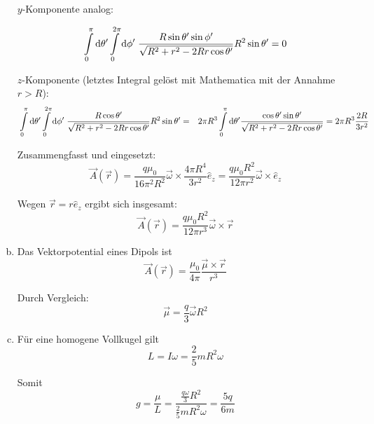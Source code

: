 \documentclass[a4paper,german,12pt,smallheadings]{scrartcl}
\begin{document}
\begin{enumerate}[a)]
  $y$-Komponente analog:

  \begin{align}
    \int\limits_0^\pi \dif \theta'
    \int\limits_0^{2 \pi} \dif \phi' \;
    \frac{R \sin \theta' \sin \phi'}{\sqrt{R^2 + r^2 - 2Rr \cos \theta'}} R^2 \sin \theta' = 0
  \end{align}

  $z$-Komponente (letztes Integral gelöst mit Mathematica mit der Annahme $r >
  R$):
  \begin{align}
    &\int\limits_0^\pi \dif \theta'
    \int\limits_0^{2 \pi} \dif \phi' \;
    \frac{R \cos \theta'}{\sqrt{R^2 + r^2 - 2Rr \cos \theta'}} R^2 \sin \theta'
    =
    &2 \pi R^3
    \int\limits_0^\pi \dif \theta'
    \frac{\cos \theta' \sin \theta'}{\sqrt{R^2 + r^2 - 2Rr \cos \theta'}}
    = 2 \pi R^3 \frac{2R}{3 r^2}
  \end{align}

  Zusammengfasst und eingesetzt:
  \begin{equation}
    \vec{A}(\vec{r})
    = \frac{q \mu_0}{16 \pi^2 R^2} \vec{\omega} \times \frac{4 \pi R^4}{3 r^2} \hat{e}_z
    = \frac{q \mu_0 R^2}{12 \pi r^2} \vec{\omega} \times \hat{e}_z
  \end{equation}

  Wegen $\vec{r} = r \hat{e}_z$ ergibt sich insgesamt:
  \begin{equation}
    \vec{A}(\vec{r}) = \frac{q \mu_0 R^2}{12 \pi r^3} \vec{\omega} \times \vec{r}
  \end{equation}
\item
  Das Vektorpotential eines Dipols ist
  \begin{equation}
    \vec{A}(\vec{r}) = \frac{\mu_0}{4 \pi} \frac{\vec{\mu} \times \vec{r}}{r^3}
  \end{equation}

  Durch Vergleich:
  \begin{equation}
    \vec{\mu} = \frac{q}{3} \vec{\omega} R^2
  \end{equation}
\item
  Für eine homogene Vollkugel gilt
  \begin{equation}
    L = I \omega = \frac{2}{5} m R^2 \omega
  \end{equation}

  Somit
  \begin{equation}
    g = \frac{\mu}{L} = \frac{\frac{q \omega}{3} R^2}{\frac{2}{5} m R^2 \omega} = \frac{5q}{6m}
  \end{equation}


\end{enumerate}
\end{document}
